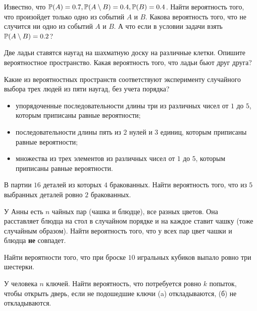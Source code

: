 \begin{problem}
    Известно, что $\operatorname{\mathbb{P}}(A) = 0.7, \operatorname{\mathbb{P}}(A \setminus B) = 0.4, \operatorname{\mathbb{P}}(B) = 0.4$.
    Найти вероятность того, что произойдет только одно из событий $A$ и $B$.
    Какова вероятность того, что не случится ни одно из событий $A$ и $B$.
    А что если в условии задачи взять $\operatorname{\mathbb{P}}(A \setminus B) = 0.2$?
\end{problem}

\begin{problem}
    Две ладьи ставятся наугад на шахматную доску на различные клетки.
    Опишите вероятностное пространство.
    Какая вероятность того, что ладьи бьют друг друга?
\end{problem}

\begin{problem}
    Какие из вероятностных пространств соответствуют эксперименту случайного выбора трех людей из пяти наугад, без учета порядка?
    \begin{itemize}
        \item
        упорядоченные последовательности длины три из различных чисел от $1$ до $5$, которым приписаны равные вероятности;
        \item
        последовательности длины пять из $2$ нулей и $3$ единиц, которым приписаны равные вероятности;
        \item
        множества из трех элементов из различных чисел от $1$ до $5$, которым приписаны равные вероятности.
    \end{itemize}
\end{problem}

\begin{problem}
    В партии $16$ деталей из которых $4$ бракованных.
    Найти вероятность того, что из $5$ выбранных деталей ровно $2$ бракованных.
\end{problem}

\begin{problem}
    У Анны есть $n$ чайных пар (чашка и блюдце), все разных цветов.
    Она расставляет блюдца на стол в случайном порядке и на каждое ставит чашку (тоже случайным образом).
    Найти вероятность того, что у всех пар цвет чашки и блюдца \textbf{не} совпадет.
\end{problem}

\begin{problem}
    Найти вероятности того, что при броске $10$ игральных кубиков выпало ровно три шестерки.
\end{problem}

\begin{problem}
    У человека $n$ ключей.
    Найти вероятность, что потребуется ровно $k$ попыток, чтобы открыть дверь, если не подошедшие ключи (a) откладываются, (б) не откладываются.
\end{problem}

